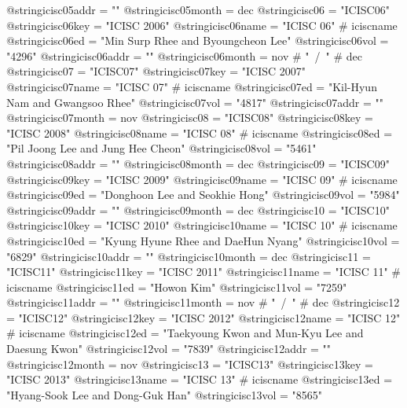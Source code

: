 @string{icisc05addr =           ""}
@string{icisc05month =          dec}
@string{icisc06 =               "ICISC06"}
@string{icisc06key =            "ICISC 2006"}
@string{icisc06name =           "ICISC 06" # iciscname}
@string{icisc06ed =             "Min Surp Rhee and Byoungcheon Lee"}
@string{icisc06vol =            "4296"}
@string{icisc06addr =           ""}
@string{icisc06month =          nov # "~/~" # dec}
@string{icisc07 =               "ICISC07"}
@string{icisc07key =            "ICISC 2007"}
@string{icisc07name =           "ICISC 07" # iciscname}
@string{icisc07ed =             "Kil-Hyun Nam and Gwangsoo Rhee"}
@string{icisc07vol =            "4817"}
@string{icisc07addr =           ""}
@string{icisc07month =          nov}
@string{icisc08 =               "ICISC08"}
@string{icisc08key =            "ICISC 2008"}
@string{icisc08name =           "ICISC 08" # iciscname}
@string{icisc08ed =             "Pil Joong Lee and Jung Hee Cheon"}
@string{icisc08vol =            "5461"}
@string{icisc08addr =           ""}
@string{icisc08month =          dec}
@string{icisc09 =               "ICISC09"}
@string{icisc09key =            "ICISC 2009"}
@string{icisc09name =           "ICISC 09" # iciscname}
@string{icisc09ed =             "Donghoon Lee and Seokhie Hong"}
@string{icisc09vol =            "5984"}
@string{icisc09addr =           ""}
@string{icisc09month =          dec}
@string{icisc10 =               "ICISC10"}
@string{icisc10key =            "ICISC 2010"}
@string{icisc10name =           "ICISC 10" # iciscname}
@string{icisc10ed =             "Kyung Hyune Rhee and DaeHun Nyang"}
@string{icisc10vol =            "6829"}
@string{icisc10addr =           ""}
@string{icisc10month =          dec}
@string{icisc11 =               "ICISC11"}
@string{icisc11key =            "ICISC 2011"}
@string{icisc11name =           "ICISC 11" # iciscname}
@string{icisc11ed =             "Howon Kim"}
@string{icisc11vol =            "7259"}
@string{icisc11addr =           ""}
@string{icisc11month =          nov # "~/~" # dec}
@string{icisc12 =               "ICISC12"}
@string{icisc12key =            "ICISC 2012"}
@string{icisc12name =           "ICISC 12" # iciscname}
@string{icisc12ed =             "Taekyoung Kwon and Mun{-}Kyu Lee and Daesung Kwon"}
@string{icisc12vol =            "7839"}
@string{icisc12addr =           ""}
@string{icisc12month =          nov}
@string{icisc13 =               "ICISC13"}
@string{icisc13key =            "ICISC 2013"}
@string{icisc13name =           "ICISC 13" # iciscname}
@string{icisc13ed =             "Hyang-Sook Lee and Dong-Guk Han"}
@string{icisc13vol =            "8565"}
